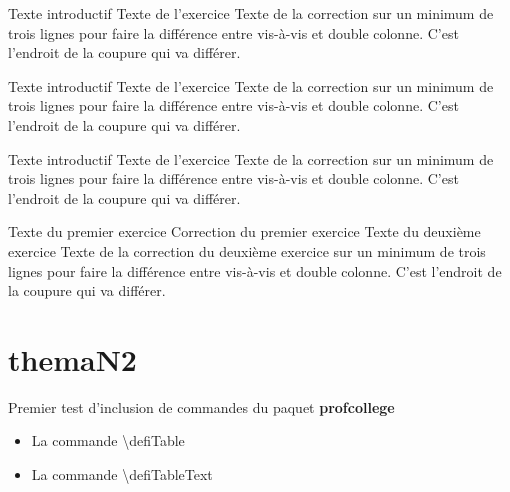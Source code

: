 \documentclass[nocrop]{sesamanuel}
\begin{document}
  \cours  
  \begin{methode}
    Texte introductif
    \exercice
    Texte de l’exercice
    \correction
    Texte de la correction sur un minimum de trois lignes pour faire la
    différence entre vis-à-vis et double colonne. C’est l’endroit de la
    coupure qui va différer.
  \end{methode}
  
  \begin{methode*1}
    Texte introductif
    \exercice
    Texte de l’exercice
    \correction
    Texte de la correction sur un minimum de trois lignes pour faire la
    différence entre vis-à-vis et double colonne. C’est l’endroit de la
    coupure qui va différer.
  \end{methode*1}
  
  \begin{methode*2}
    Texte introductif
    \exercice
    Texte de l’exercice
    \correction
    Texte de la correction sur un minimum de trois lignes pour faire la
    différence entre vis-à-vis et double colonne. C’est l’endroit de la
    coupure qui va différer.
  \end{methode*2}
  
  \begin{methode*2*2}
    \exercice    
    Texte du premier exercice
    \correction
    Correction du premier exercice
    \exercice
    Texte du deuxième exercice
    \correction
    Texte de la correction du deuxième exercice sur un minimum de trois
    lignes pour faire la différence entre vis-à-vis et double
    colonne. C’est l’endroit de la coupure qui va différer.
  \end{methode*2*2}


\chapter{themaN2}

\begin{prerequis}
    Premier test d'inclusion de commandes du paquet \textbf{profcollege}
    \begin{itemize}
    \item La commande \textbackslash defiTable{}
    \item La commande \textbackslash defiTableText{}
    \end{itemize}
\end{prerequis}
\end{document}
